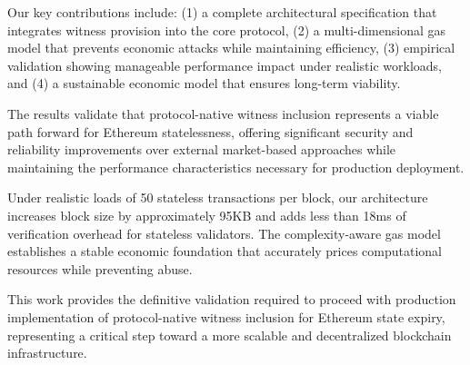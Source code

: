 \documentclass{article}
\begin{document}
Our key contributions include: (1) a complete architectural specification that integrates witness provision into the core protocol, (2) a multi-dimensional gas model that prevents economic attacks while maintaining efficiency, (3) empirical validation showing manageable performance impact under realistic workloads, and (4) a sustainable economic model that ensures long-term viability.

The results validate that protocol-native witness inclusion represents a viable path forward for Ethereum statelessness, offering significant security and reliability improvements over external market-based approaches while maintaining the performance characteristics necessary for production deployment.

Under realistic loads of 50 stateless transactions per block, our architecture increases block size by approximately 95KB and adds less than 18ms of verification overhead for stateless validators. The complexity-aware gas model establishes a stable economic foundation that accurately prices computational resources while preventing abuse.

This work provides the definitive validation required to proceed with production implementation of protocol-native witness inclusion for Ethereum state expiry, representing a critical step toward a more scalable and decentralized blockchain infrastructure.




\end{document}
